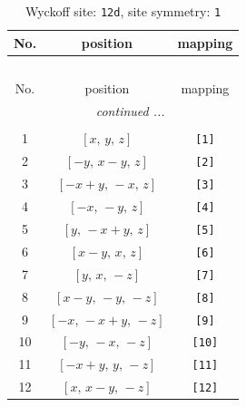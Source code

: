 \documentclass[fleqn,8pt]{jsarticle}
\begin{document}
\renewcommand{\arraystretch}{1.2}
\begin{longtable}{ccc}
\caption{Wyckoff site: {\tt 12d}, site symmetry: {\tt 1}}
 \\
 \hline \hline
No. & position & mapping \\ \hline \endfirsthead

\multicolumn{2}{l}{\tablename\ \thetable{}} \\
 \hline \hline
No. & position & mapping \\ \hline \endhead

 \hline \hline
\multicolumn{2}{r}{\footnotesize\it continued ...} \\ \endfoot

 \hline \hline
\multicolumn{2}{r}{} \\ \endlastfoot

1 & $\left[ x,\, y,\, z \right]$ & {\tt [1]} \\ \hline
2 & $\left[ - y,\, x - y,\, z \right]$ & {\tt [2]} \\ \hline
3 & $\left[ - x + y,\, - x,\, z \right]$ & {\tt [3]} \\ \hline
4 & $\left[ - x,\, - y,\, z \right]$ & {\tt [4]} \\ \hline
5 & $\left[ y,\, - x + y,\, z \right]$ & {\tt [5]} \\ \hline
6 & $\left[ x - y,\, x,\, z \right]$ & {\tt [6]} \\ \hline
7 & $\left[ y,\, x,\, - z \right]$ & {\tt [7]} \\ \hline
8 & $\left[ x - y,\, - y,\, - z \right]$ & {\tt [8]} \\ \hline
9 & $\left[ - x,\, - x + y,\, - z \right]$ & {\tt [9]} \\ \hline
10 & $\left[ - y,\, - x,\, - z \right]$ & {\tt [10]} \\ \hline
11 & $\left[ - x + y,\, y,\, - z \right]$ & {\tt [11]} \\ \hline
12 & $\left[ x,\, x - y,\, - z \right]$ & {\tt [12]} \\
\end{longtable}
\end{document}
